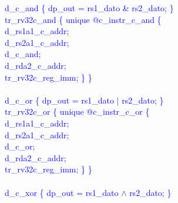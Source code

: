 \textcolor{blue}{
\indent d\_c\_and \{ dp\_out = rs1\_dato \& rs2\_dato; \}\\%
\indent tr\_rv32c\_and \{ unique @c\_instr\_c\_and \{ \\%
\indent \hspace{\parindent} d\_rs1a1\_c\_addr; \\%
\indent \hspace{\parindent} d\_rs2a1\_c\_addr; \\%
\indent \hspace{\parindent} d\_c\_and; \\%
\indent \hspace{\parindent} d\_rda2\_c\_addr;\\%
\indent \hspace{\parindent} tr\_rv32c\_reg\_imm; \} \} \\%
\\
\indent d\_c\_or \{ dp\_out = rs1\_dato $\vert$ rs2\_dato; \}\\%
\indent tr\_rv32c\_or \{ unique @c\_instr\_c\_or \{ \\%
\indent \hspace{\parindent} d\_rs1a1\_c\_addr; \\%
\indent \hspace{\parindent} d\_rs2a1\_c\_addr; \\%
\indent \hspace{\parindent} d\_c\_or; \\%
\indent \hspace{\parindent} d\_rda2\_c\_addr;\\%
\indent \hspace{\parindent} tr\_rv32c\_reg\_imm; \} \} \\%
\\
\indent d\_c\_xor \{ dp\_out = rs1\_dato $\wedge$ rs2\_dato; \}\\%
}
